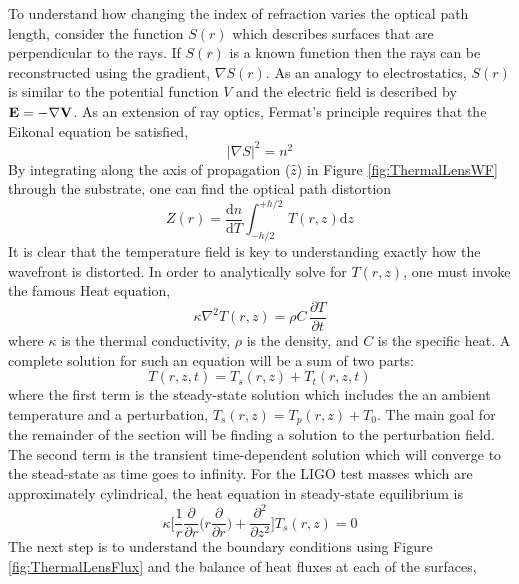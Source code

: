 	To understand how changing the index of refraction varies the optical path length, consider the function $S(r)$ which describes surfaces that are perpendicular to the rays. If $S(r)$ is a known function then the rays can be reconstructed using the gradient, $\nabla S(r)$.  As an analogy to electrostatics, $S(r)$ is similar to the potential function $V$ and the electric field is described by $\bf{E}=-\nabla V$.  As an extension of ray optics, Fermat's principle requires that the Eikonal equation be satisfied,
	\begin{equation}
	\vert \nabla S \vert^2 = n^2
	\end{equation}
	By integrating along the axis of propagation ($\hat{z}$) in Figure \ref{fig:ThermalLensWF} through the substrate, one can find the optical path distortion
	\begin{equation}\label{eq:thermoref}
	Z(r) =  \frac{\text{d}n}{\text{d}T} \int_{-h/2}^{+h/2} \, T(r,z) \text{d}z
	\end{equation}
	It is clear that the temperature field is key to understanding exactly how the wavefront is distorted. In order to analytically solve for $T(r,z)$, one must invoke the famous Heat equation,
	\begin{equation}\label{eq:heat_eq}
		\kappa \nabla^2 T(r,z) = \rho C\, \frac{\partial T}{\partial t} 
	\end{equation}
	where $\kappa$ is the thermal conductivity, $\rho$ is the density, and $C$ is the specific heat.  A complete solution for such an equation will be a sum of two parts: 
	\begin{equation}
	T(r,z,t) = T_{s}(r,z) + T_{t}(r,z,t)
	\end{equation} 
	where the first term is the steady-state solution which includes the an ambient temperature and a perturbation, $T_s(r,z) = T_p(r,z) + T_0$.  The main goal for the remainder of the section will be finding a solution to the perturbation field.  The second term is the transient time-dependent solution which will converge to the stead-state as time goes to infinity.  For the LIGO test masses which are approximately cylindrical, the heat equation in steady-state equilibrium is
	\begin{equation}
		\kappa \bigg[ \frac{1}{r} \frac{\partial}{\partial r} \bigg( r \frac{\partial}{\partial r}\bigg) +  \frac{\partial^2}{\partial z^2} \bigg] T_s(r,z) = 0
	\end{equation}
	The next step is to understand the boundary conditions using Figure \ref{fig:ThermalLensFlux} and the balance of heat fluxes at each of the surfaces,

